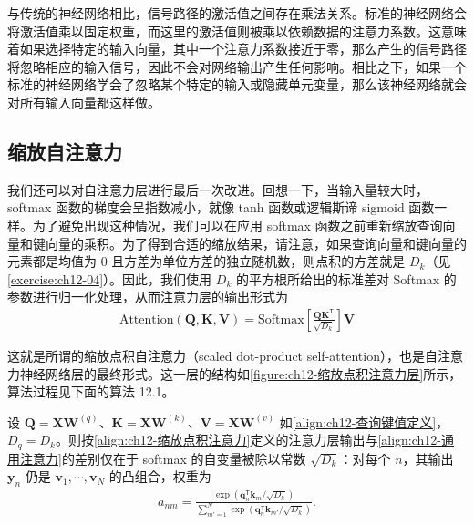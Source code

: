\documentclass[../../main.tex]{subfiles}
\begin{document}
与传统的神经网络相比，信号路径的激活值之间存在乘法关系。标准的神经网络会将激活值乘以固定权重，而这里的激活值则被乘以依赖数据的注意力系数。这意味着如果选择特定的输入向量，其中一个注意力系数接近于零，那么产生的信号路径将忽略相应的输入信号，因此不会对网络输出产生任何影响。相比之下，如果一个标准的神经网络学会了忽略某个特定的输入或隐藏单元变量，那么该神经网络就会对所有输入向量都这样做。

\subsection{缩放自注意力}\label{subsection:ch12-缩放自注意力}

我们还可以对自注意力层进行最后一次改进。回想一下，当输入量较大时，softmax 函数的梯度会呈指数减小，就像 tanh 函数或逻辑斯谛 sigmoid 函数一样。为了避免出现这种情况，我们可以在应用 softmax 函数之前重新缩放查询向量和键向量的乘积。为了得到合适的缩放结果，请注意，如果查询向量和键向量的元素都是均值为 0 且方差为单位方差的独立随机数，则点积的方差就是 $D_k$（见\cref{exercise:ch12-04}）。因此，我们使用 $D_k$ 的平方根所给出的标准差对 Softmax 的参数进行归一化处理，从而注意力层的输出形式为
\begin{align}
\mathrm{Attention}(\mathbf{Q},\mathbf{K},\mathbf{V})=\mathrm{Softmax}\left[\frac{\mathbf{Q}\mathbf{K}^{\mathsf{T}}}{\sqrt{D_k}}\right]\mathbf{V}
\label{align:ch12-缩放点积注意力}
\end{align}

这就是所谓的缩放点积自注意力（scaled dot-product self-attention），也是自注意力神经网络层的最终形式。这一层的结构如\cref{figure:ch12-缩放点积注意力层}所示，算法过程见下面的算法 12.1。

\begin{proposition}[缩放点积注意力的输出形式]\label{proposition:ch12-缩放点积注意力}
设 $\mathbf{Q}=\mathbf{X}\mathbf{W}^{(q)}$、$\mathbf{K}=\mathbf{X}\mathbf{W}^{(k)}$、$\mathbf{V}=\mathbf{X}\mathbf{W}^{(v)}$ 如\eqref{align:ch12-查询键值定义}，$D_q=D_k$。则按\eqref{align:ch12-缩放点积注意力}定义的注意力层输出与\eqref{align:ch12-通用注意力}的差别仅在于 softmax 的自变量被除以常数 $\sqrt{D_k}$：对每个 $n$，其输出 $\mathbf{y}_n$ 仍是 $\mathbf{v}_1,\cdots,\mathbf{v}_N$ 的凸组合，权重为
\begin{align}
a_{nm}=\frac{\exp\left(\mathbf{q}_n^{\mathsf{T}}\mathbf{k}_m/\sqrt{D_k}\right)}{\sum_{m'=1}^{N}\exp\left(\mathbf{q}_n^{\mathsf{T}}\mathbf{k}_{m'}/\sqrt{D_k}\right)}.
\label{align:ch12-缩放注意力权重}
\end{align}
\end{proposition}
\end{document}
